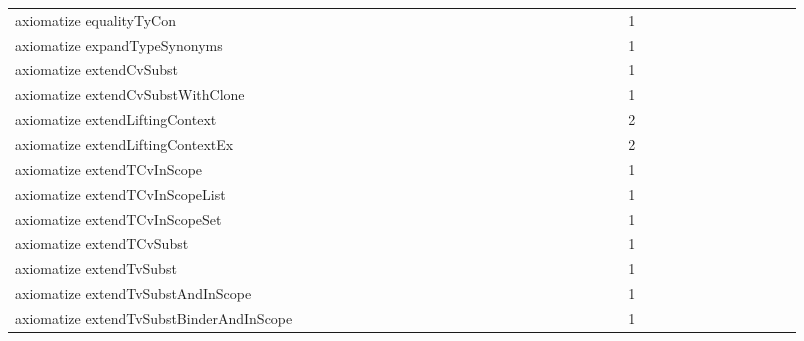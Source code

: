 {\begin{tabular}{l|rrr|rrr|rrr}
axiomatize equalityTyCon &  &  &  &  &  &  &  &  &  &  &  &  &  &  &  &  &  &  &  &  &  &  &  & 1 &  &  &  &  &  &  &  &  &  &  &  & \\
axiomatize expandTypeSynonyms &  &  &  &  &  &  &  &  &  &  &  &  &  &  &  &  &  &  &  &  &  &  &  & 1 &  &  &  &  &  &  &  &  &  &  &  & \\
axiomatize extendCvSubst &  &  &  &  &  &  &  &  &  &  &  &  &  &  &  &  &  &  &  &  &  &  &  & 1 &  &  &  &  &  &  &  &  &  &  &  & \\
axiomatize extendCvSubstWithClone &  &  &  &  &  &  &  &  &  &  &  &  &  &  &  &  &  &  &  &  &  &  &  & 1 &  &  &  &  &  &  &  &  &  &  &  & \\
axiomatize extendLiftingContext &  &  &  &  &  &  &  &  &  &  &  &  &  &  &  &  &  &  &  &  &  &  &  & 2 &  &  &  &  &  &  &  &  &  &  &  & \\
axiomatize extendLiftingContextEx &  &  &  &  &  &  &  &  &  &  &  &  &  &  &  &  &  &  &  &  &  &  &  & 2 &  &  &  &  &  &  &  &  &  &  &  & \\
axiomatize extendTCvInScope &  &  &  &  &  &  &  &  &  &  &  &  &  &  &  &  &  &  &  &  &  &  &  & 1 &  &  &  &  &  &  &  &  &  &  &  & \\
axiomatize extendTCvInScopeList &  &  &  &  &  &  &  &  &  &  &  &  &  &  &  &  &  &  &  &  &  &  &  & 1 &  &  &  &  &  &  &  &  &  &  &  & \\
axiomatize extendTCvInScopeSet &  &  &  &  &  &  &  &  &  &  &  &  &  &  &  &  &  &  &  &  &  &  &  & 1 &  &  &  &  &  &  &  &  &  &  &  & \\
axiomatize extendTCvSubst &  &  &  &  &  &  &  &  &  &  &  &  &  &  &  &  &  &  &  &  &  &  &  & 1 &  &  &  &  &  &  &  &  &  &  &  & \\
axiomatize extendTvSubst &  &  &  &  &  &  &  &  &  &  &  &  &  &  &  &  &  &  &  &  &  &  &  & 1 &  &  &  &  &  &  &  &  &  &  &  & \\
axiomatize extendTvSubstAndInScope &  &  &  &  &  &  &  &  &  &  &  &  &  &  &  &  &  &  &  &  &  &  &  & 1 &  &  &  &  &  &  &  &  &  &  &  & \\
axiomatize extendTvSubstBinderAndInScope &  &  &  &  &  &  &  &  &  &  &  &  &  &  &  &  &  &  &  &  &  &  &  & 1 &  &  &  &  &  &  &  &  &  &  &  & \\

\end{tabular}}

